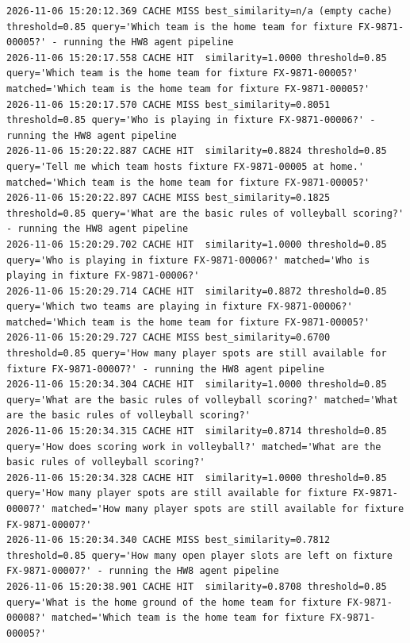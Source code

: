\documentclass[11pt]{article}
\begin{document}
\begingroup\lstset{basicstyle=\ttfamily\tiny}
\begin{lstlisting}
2026-11-06 15:20:12.369 CACHE MISS best_similarity=n/a (empty cache) threshold=0.85 query='Which team is the home team for fixture FX-9871-00005?' - running the HW8 agent pipeline
2026-11-06 15:20:17.558 CACHE HIT  similarity=1.0000 threshold=0.85 query='Which team is the home team for fixture FX-9871-00005?' matched='Which team is the home team for fixture FX-9871-00005?'
2026-11-06 15:20:17.570 CACHE MISS best_similarity=0.8051 threshold=0.85 query='Who is playing in fixture FX-9871-00006?' - running the HW8 agent pipeline
2026-11-06 15:20:22.887 CACHE HIT  similarity=0.8824 threshold=0.85 query='Tell me which team hosts fixture FX-9871-00005 at home.' matched='Which team is the home team for fixture FX-9871-00005?'
2026-11-06 15:20:22.897 CACHE MISS best_similarity=0.1825 threshold=0.85 query='What are the basic rules of volleyball scoring?' - running the HW8 agent pipeline
2026-11-06 15:20:29.702 CACHE HIT  similarity=1.0000 threshold=0.85 query='Who is playing in fixture FX-9871-00006?' matched='Who is playing in fixture FX-9871-00006?'
2026-11-06 15:20:29.714 CACHE HIT  similarity=0.8872 threshold=0.85 query='Which two teams are playing in fixture FX-9871-00006?' matched='Which team is the home team for fixture FX-9871-00005?'
2026-11-06 15:20:29.727 CACHE MISS best_similarity=0.6700 threshold=0.85 query='How many player spots are still available for fixture FX-9871-00007?' - running the HW8 agent pipeline
2026-11-06 15:20:34.304 CACHE HIT  similarity=1.0000 threshold=0.85 query='What are the basic rules of volleyball scoring?' matched='What are the basic rules of volleyball scoring?'
2026-11-06 15:20:34.315 CACHE HIT  similarity=0.8714 threshold=0.85 query='How does scoring work in volleyball?' matched='What are the basic rules of volleyball scoring?'
2026-11-06 15:20:34.328 CACHE HIT  similarity=1.0000 threshold=0.85 query='How many player spots are still available for fixture FX-9871-00007?' matched='How many player spots are still available for fixture FX-9871-00007?'
2026-11-06 15:20:34.340 CACHE MISS best_similarity=0.7812 threshold=0.85 query='How many open player slots are left on fixture FX-9871-00007?' - running the HW8 agent pipeline
2026-11-06 15:20:38.901 CACHE HIT  similarity=0.8708 threshold=0.85 query='What is the home ground of the home team for fixture FX-9871-00008?' matched='Which team is the home team for fixture FX-9871-00005?'
\end{lstlisting}
\endgroup
\end{document}
